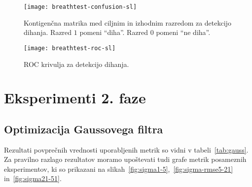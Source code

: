 \begin{figure}[!htbp]
	\centering
	\texttt{[image: breathtest-confusion-sl]}
	\caption[Kontigenčna matrika za detekcijo dihanja]{Kontigenčna matrika med ciljnim in izhodnim razredom za detekcijo dihanja. Razred $1$ pomeni ``diha''. Razred $0$ pomeni ``ne diha''.}
	\label{fig:breathtest-confusion}
\end{figure}

\begin{figure}[!htbp]
	\centering
	\texttt{[image: breathtest-roc-sl]}
	\caption[ROC krivulja za detekcijo dihanja]{ROC krivulja za detekcijo dihanja.}
	\label{fig:breathtest-roc}
\end{figure}




























\section{Eksperimenti 2. faze}


\subsection{Optimizacija Gaussovega filtra}
Rezultati povprečnih vrednosti uporabljenih metrik so vidni v tabeli~\ref{tab:gauss}. Za pravilno razlago rezultatov moramo upoštevati tudi grafe metrik posameznih eksperimentov, ki so prikazani na slikah~\ref{fig:sigma1-5},~\ref{fig:sigma-rmse5-21} in~\ref{fig:sigma21-51}. 



